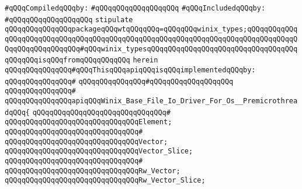 \verb|#qQQqCompiledqQQqby:|\newline
\verb|#qQQqqQQqqQQqqQQqqQQq|\newline
\newline
\verb|#qQQqIncludedqQQqby:|\newline
\verb|#qQQqqQQqqQQqqQQqqQQq|\newline
\newline
\verb|stipulate|\newline
\verb|qQQqqQQqqQQqqQQqpackageqQQqwtqQQqqQQq=qQQqqQQqwinix_types;qQQqqQQqqQQqqQQqqQQqqQQqqQQqqQQqqQQqqQQqqQQqqQQqqQQqqQQqqQQqqQQqqQQqqQQqqQQqqQQqqQQqqQQqqQQqqQQqqQQq#qQQqwinix_typesqQQqqQQqqQQqqQQqqQQqqQQqqQQqqQQqqQQqqQQqqQQqisqQQqfromqQQqqQQqqQQq|\newline
\verb|herein|\newline
\newline
\verb|qQQqqQQqqQQqqQQq#qQQqThisqQQqapiqQQqisqQQqimplementedqQQqby:|\newline
\verb|qQQqqQQqqQQqqQQq#|\newline
\verb|qQQqqQQqqQQqqQQq#qQQqqQQqqQQqqQQqqQQq|\newline
\verb|qQQqqQQqqQQqqQQq#|\newline
\verb|qQQqqQQqqQQqqQQqapiqQQqWinix_Base_File_Io_Driver_For_Os__PremicrothreadqQQq{|\newline
\verb|qQQqqQQqqQQqqQQqqQQqqQQqqQQqqQQq#|\newline
\verb|qQQqqQQqqQQqqQQqqQQqqQQqqQQqqQQqElement;|\newline
\verb|qQQqqQQqqQQqqQQqqQQqqQQqqQQqqQQq#|\newline
\verb|qQQqqQQqqQQqqQQqqQQqqQQqqQQqqQQqVector;|\newline
\verb|qQQqqQQqqQQqqQQqqQQqqQQqqQQqqQQqVector_Slice;|\newline
\verb|qQQqqQQqqQQqqQQqqQQqqQQqqQQqqQQq#|\newline
\verb|qQQqqQQqqQQqqQQqqQQqqQQqqQQqqQQqRw_Vector;|\newline
\verb|qQQqqQQqqQQqqQQqqQQqqQQqqQQqqQQqRw_Vector_Slice;|\newline
